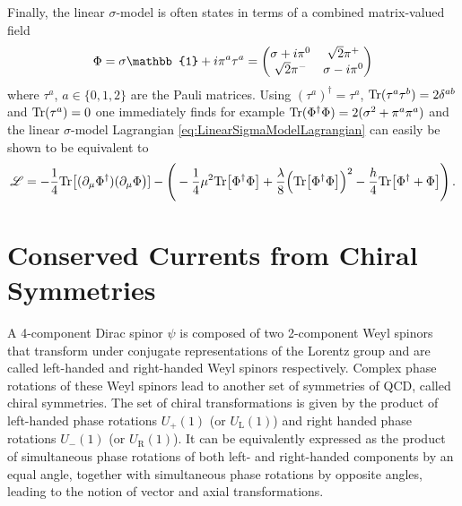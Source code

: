 Finally, the linear $\sigma$-model is often states in terms of a combined matrix-valued field
\begin{equation}
    \Phi=\sigma\mathbb{1}+\imagu\pi^a\tau^a=\begin{pmatrix}
        \sigma+\imagu\pi^0 & \sqrt{2}\pi^+      \\
        \sqrt{2}\pi^-      & \sigma-\imagu\pi^0
    \end{pmatrix}
\end{equation}
where $\tau^a$, ${a\in\{0,1,2\}}$ are the Pauli matrices. Using ${(\tau^a)^\dagger=\tau^a}$, ${{\text{Tr}}(\tau^a\tau^b)=2\delta^{ab}}$ and ${{\text{Tr}}(\tau^a)=0}$ one immediately finds for example ${{\text{Tr}}(\Phi^\dagger\Phi)=2(\sigma^2+\pi^a\pi^a)}$ and the linear $\sigma$-model Lagrangian \eqref{eq:LinearSigmaModelLagrangian} can easily be shown to be equivalent to
\begin{equation}
    \mathscr{L}=-\frac{1}{4}{\text{Tr}}\big[(\partial_\mu\Phi^\dagger)(\partial_\mu\Phi\big)]-\Bigg(-\frac{1}{4}\mu^2{\text{Tr}}\big[\Phi^\dagger\Phi\big]+\frac{\lambda}{8}\Big({\text{Tr}}\big[\Phi^\dagger\Phi\big]\Big)^2-\frac{h}{4}{\text{Tr}}\big[\Phi^\dagger+\Phi\big]\Bigg)\,.
    \label{eq:Lagrangian_LinearSigma2}
\end{equation}











\section{Conserved Currents from Chiral Symmetries}

A 4-component Dirac spinor $\psi$ is composed of two 2-component Weyl spinors that transform under conjugate representations of the Lorentz group and are called left-handed and right-handed Weyl spinors respectively. Complex phase rotations of these Weyl spinors lead to another set of symmetries of QCD, called chiral symmetries. The set of chiral transformations is given by the product of left-handed phase rotations ${U_+(1)}$ (or ${U_{\text{L}}(1)}$) and right handed phase rotations ${U_-(1)}$ (or ${U_{\text{R}}(1)}$). It can be equivalently expressed as the product of simultaneous phase rotations of both left- and right-handed components by an equal angle, together with simultaneous phase rotations by opposite angles, leading to the notion of vector and axial transformations.

